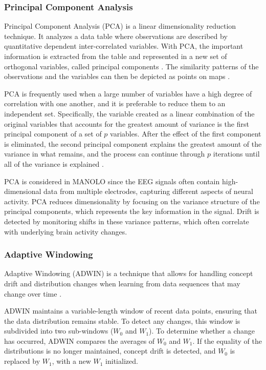 \subsubsection{Principal Component Analysis}

Principal Component Analysis (PCA) is a linear dimensionality reduction technique. It analyzes a data table where observations are described by quantitative dependent inter-correlated variables. With PCA, the important information is extracted from the table and represented in a new set of orthogonal variables, called principal components \cite{bro2014principal}. The similarity patterns of the observations and the variables can then be depicted as points on maps \cite{abdi2010principal}.

PCA is frequently used when a large number of variables have a high degree of correlation with one another, and it is preferable to reduce them to an independent set. Specifically, the variable created as a linear combination of the original variables that accounts for the greatest amount of variance is the first principal component of a set of \( p \) variables. After the effect of the first component is eliminated, the second principal component explains the greatest amount of the variance in what remains, and the process can continue through \( p \) iterations until all of the variance is explained \cite{jolliffe2016principal}\cite{shao2014prototype}.

PCA is considered in MANOLO since the EEG signals often contain high-dimensional data from multiple electrodes, capturing different aspects of neural activity. PCA reduces dimensionality by focusing on the variance structure of the principal components, which represents the key information in the signal. Drift is detected by monitoring shifts in these variance patterns, which often correlate with underlying brain activity changes.

\subsubsection{Adaptive Windowing}

Adaptive Windowing (ADWIN) \cite{bifet2007learning} is a technique that allows for handling concept drift and distribution changes when learning from data sequences that may change over time \cite{sun2016online}. 

ADWIN maintains a variable-length window of recent data points, ensuring that the data distribution remains stable. To detect any changes, this window is subdivided into two sub-windows ($W_0$ and $W_1$). To determine whether a change has occurred, ADWIN compares the averages of $W_0$ and $W_1$. If the equality of the distributions is no longer maintained, concept drift is detected, and $W_0$ is replaced by $W_1$, with a new $W_1$ initialized.

